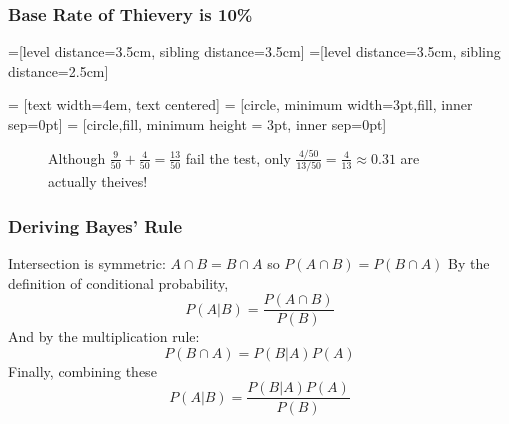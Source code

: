 \documentclass[handout]{beamer}
\begin{document}
\begin{frame}
\frametitle{Base Rate of Thievery is 10\%}

=[level distance=3.5cm, sibling distance=3.5cm]
=[level distance=3.5cm, sibling distance=2.5cm]

 = [text width=4em, text centered]
 = [circle, minimum width=3pt,fill, inner sep=0pt]
 = [circle,fill, minimum height = 3pt, inner sep=0pt]
\begin{figure}
\centering
{}
\caption{Although $\frac{9}{50} + \frac{4}{50} = \frac{13}{50}$ fail the test, only $\frac{4/50}{13/50} = \frac{4}{13} \approx 0.31$ are actually theives!}
\end{figure}


\end{frame}
\begin{frame}
\frametitle{Deriving Bayes' Rule}
Intersection is symmetric: $A\cap B = B\cap A$ so $P(A\cap B) = P(B \cap A)$ \pause  By the definition of conditional probability,
	$$P(A|B) = \frac{P(A\cap B)}{P(B)}$$ \pause
And by the multiplication rule:
	$$P(B\cap A) = P(B|A)P(A)$$ \pause
Finally, combining these
	$$P(A|B) = \frac{P(B|A)P(A)}{P(B)}$$
\end{frame}
\end{document}
